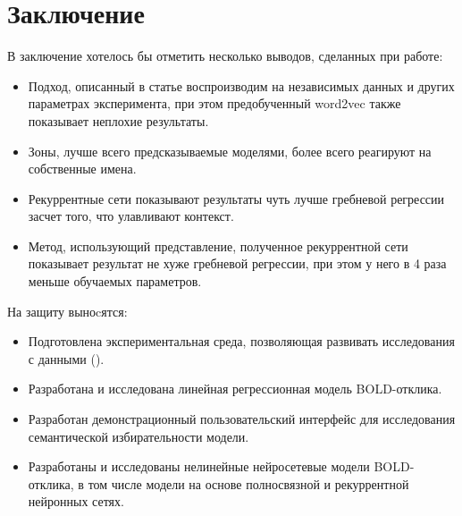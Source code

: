 \documentclass[pdftex,ptm,12pt,a4paper]{report}
\theoremstyle{definition}
\begin{document}
\chapter{Заключение}

В заключение хотелось бы отметить несколько выводов, сделанных при работе:

\begin{itemize}
\item Подход, описанный в статье \cite{hanke2014high} воспроизводим на независимых данных и других параметрах эксперимента, при этом предобученный word2vec также показывает неплохие результаты.

\item Зоны, лучше всего предсказываемые моделями, более всего реагируют на собственные имена.

\item Рекуррентные сети показывают результаты чуть лучше гребневой регрессии засчет того, что улавливают контекст.

\item Метод, использующий представление, полученное рекуррентной сети показывает результат не хуже гребневой регрессии, при этом у него в 4 раза меньше обучаемых параметров.
\end{itemize}

\newpage

На защиту выноcятся:
\begin{itemize}
\item Подготовлена экспериментальная среда, позволяющая развивать исследования с данными (\cite{huth2016natural}).
\item Разработана и исследована линейная регрессионная модель BOLD-отклика.
\item Разработан демонстрационный пользовательский интерфейс для исследования семантической избирательности модели.
\item Разработаны и исследованы нелинейные нейросетевые модели BOLD-отклика, в том числе модели на основе полносвязной и рекуррентной нейронных сетях.
\end{itemize}



\end{document}
